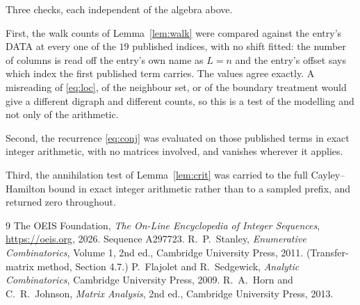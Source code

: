 \documentclass[11pt,a4paper]{article}
\theoremstyle{plain}
\theoremstyle{definition}
\begin{document}
Three checks, each independent of the algebra above.

First, the walk counts of Lemma~\ref{lem:walk} were compared against the entry's DATA at
every one of the $19$ published indices, with no shift fitted: the number of columns is
read off the entry's own name as $L=n$ and the entry's offset says which index the first
published term carries. The values agree exactly. A misreading of \eqref{eq:loc}, of the
neighbour set, or of the boundary treatment would give a different digraph and different
counts, so this is a test of the modelling and not only of the arithmetic.

Second, the recurrence \eqref{eq:conj} was evaluated on those published terms in exact
integer arithmetic, with no matrices involved, and vanishes wherever it applies.

Third, the annihilation test of Lemma~\ref{lem:crit} was carried to the full
Cayley--Hamilton bound in exact integer arithmetic rather than to a sampled prefix, and
returned zero throughout.

\begin{thebibliography}{9}
 The OEIS Foundation, \emph{The On-Line Encyclopedia of Integer
Sequences}, \url{https://oeis.org}, 2026. Sequence A297723.
 R.~P.~Stanley, \emph{Enumerative Combinatorics}, Volume 1, 2nd ed.,
Cambridge University Press, 2011. (Transfer-matrix method, Section 4.7.)
 P.~Flajolet and R.~Sedgewick, \emph{Analytic Combinatorics}, Cambridge
University Press, 2009.
 R.~A.~Horn and C.~R.~Johnson, \emph{Matrix Analysis}, 2nd ed., Cambridge
University Press, 2013.
\end{thebibliography}
\end{document}
